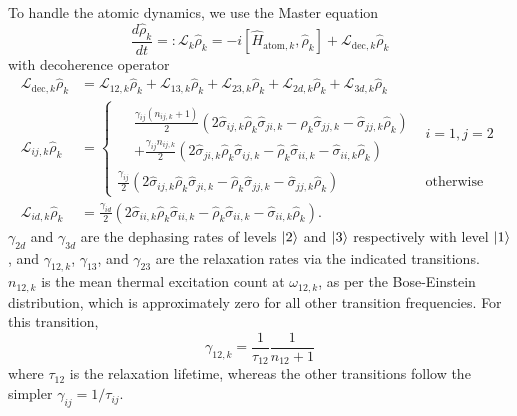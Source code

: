 To handle the atomic dynamics, we use the Master equation
\begin{equation}
    \label{eq:three_level_atom_master_equation}
    \frac{d\hat{\rho}_k}{dt} =: \mathcal{L}_k\hat{\rho}_k = -i[\hat{H}_{\text{atom},k}, \hat{\rho}_k] + \mathcal{L}_{\text{dec},k}\hat{\rho}_k
\end{equation}
with decoherence operator
\begin{equation}
\label{eq:three_level_atom_loss_operator}
\begin{split}
    \mathcal{L}_{\text{dec},k}\hat{\rho}_k &= \mathcal{L}_{12,k}\hat{\rho}_k + \mathcal{L}_{13,k}\hat{\rho}_k + \mathcal{L}_{23,k}\hat{\rho}_k + \mathcal{L}_{2d,k}\hat{\rho}_k + \mathcal{L}_{3d,k}\hat{\rho}_k\\
    \mathcal{L}_{ij,k}\hat{\rho}_k &=
    \begin{cases}
        \begin{split}
            &\frac{\gamma_{ij}(n_{ij,k}+1)}{2} \left(2\hat{\sigma}_{ij,k}\hat{\rho}_k\hat{\sigma}_{ji,k} - \hat{\rho}_k\hat{\sigma}_{jj,k} - \hat{\sigma}_{jj,k}\hat{\rho}_k\right)\\
            &+ \frac{\gamma_{ij}n_{ij,k}}{2} \left(2\hat{\sigma}_{ji,k}\hat{\rho}_k\hat{\sigma}_{ij,k} - \hat{\rho}_k\hat{\sigma}_{ii,k} - \hat{\sigma}_{ii,k}\hat{\rho}_k\right)
        \end{split}
        & i=1,j=2\\
        \frac{\gamma_{ij}}{2} \left(2\hat{\sigma}_{ij,k}\hat{\rho}_k\hat{\sigma}_{ji,k} - \hat{\rho}_k\hat{\sigma}_{jj,k} - \hat{\sigma}_{jj,k}\hat{\rho}_k\right) & \text{otherwise}
    \end{cases}\\
    \mathcal{L}_{id,k}\hat{\rho}_k &= \frac{\gamma_{id}}{2} \left(2\hat{\sigma}_{ii,k}\hat{\rho}_k\hat{\sigma}_{ii,k} - \hat{\rho}_k\hat{\sigma}_{ii,k} - \hat{\sigma}_{ii,k}\hat{\rho}_k\right).
\end{split}
\end{equation}
$\gamma_{2d}$ and $\gamma_{3d}$ are the dephasing rates of levels $\left|2\right\rangle$ and $\left|3\right\rangle$ respectively with level $\left|1\right\rangle$, and $\gamma_{12,k}$, $\gamma_{13}$, and $\gamma_{23}$ are the relaxation rates via the indicated transitions. $n_{12,k}$ is the mean thermal excitation count at $\omega_{12,k}$, as per the Bose-Einstein distribution, which is approximately zero for all other transition frequencies. For this transition,
\begin{equation}
    \gamma_{12,k} = \frac{1}{\tau_{12}} \frac{1}{n_{12}+1}
\end{equation}
where $\tau_{12}$ is the relaxation lifetime, whereas the other transitions follow the simpler $\gamma_{ij} = 1/\tau_{ij}$.

